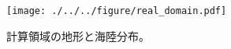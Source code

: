 \begin{figure}[tb]
\begin{center}
  \texttt{[image: ./../../figure/real\_domain.pdf]}\\
  \caption{計算領域の地形と海陸分布。}
  \label{fig:tutrial_real_domain}
\end{center}
\end{figure}
